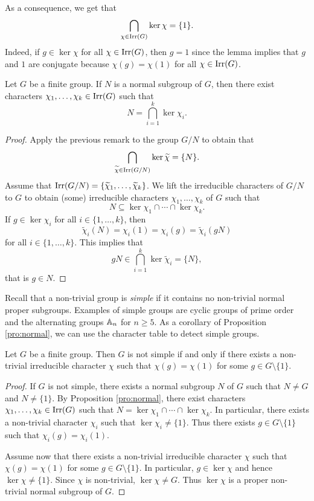 As a consequence, we get that 
\begin{equation}
\label{eq:kernels}
\bigcap_{\chi\in\operatorname{Irr}(G)}\ker\chi=\{1\}.
\end{equation}
Indeed, if $g\in\ker\chi$ for all $\chi\in\operatorname{Irr}(G)$, then $g=1$ since 
the lemma implies that $g$ and $1$ are conjugate
because 
$\chi(g)=\chi(1)$ for all $\chi\in\operatorname{Irr}(G)$.

\begin{proposition}
\label{pro:normal}
    Let $G$ be a finite group. 
    If $N$ is a normal subgroup of $G$, 
    then there exist characters
    $\chi_1,\dots,\chi_k\in\operatorname{Irr}(G)$ 
    such that
    \[
    N=\bigcap_{i=1}^k\ker\chi_i.
    \]
\end{proposition}

\begin{proof}
    Apply the previous remark to the group $G/N$ to obtain that 
    \[
    \bigcap_{\widetilde{\chi}\in\operatorname{Irr}(G/N)}\ker\widetilde{\chi}=\{N\}.
    \]
    Assume that $\operatorname{Irr}(G/N)=\{\widetilde{\chi}_1,\dots,\widetilde{\chi}_k\}$. 
    We lift the irreducible characters of $G/N$ to $G$ 
    to obtain (some) irreducible characters $\chi_1,\dots,\chi_k$ 
    of $G$ such that 
    \[
    N\subseteq\ker\chi_1\cap\cdots\cap\ker\chi_k.
    \]
    If $g\in\ker\chi_i$ for all $i\in\{1,\dots,k\}$, then 
    \[
    \widetilde{\chi}_i(N)=\chi_i(1)=\chi_i(g)=\widetilde{\chi}_i(gN)
    \]
    for all $i\in\{1,\dots,k\}$. This implies that
    \[
    gN\in\bigcap_{i=1}^k\ker\widetilde{\chi}_i=\{N\},
    \]
    that is $g\in N$. 
\end{proof}

Recall that a non-trivial group is \emph{simple} if it contains no non-trivial normal 
proper subgroups. Examples of simple groups are cyclic groups of prime order
and the alternating groups $\mathbb{A}_n$ for $n\geq5$. 
As a corollary of Proposition \ref{pro:normal}, 
we can use the character table to detect simple groups.

\begin{proposition}
    Let $G$ be a finite group. Then $G$ is not simple if and only if 
    there exists a non-trivial irreducible character $\chi$ such that
    $\chi(g)=\chi(1)$ 
    for some $g\in G\setminus\{1\}$. 
\end{proposition}

\begin{proof}
    If $G$ is not simple, there exists a normal subgroup $N$ of $G$ such that
    $N\ne G$ and $N\ne\{1\}$. 
    By Proposition \ref{pro:normal}, there exist characters 
    $\chi_1,\dots,\chi_k\in\operatorname{Irr}(G)$
    such that 
    $N=\ker\chi_1\cap\cdots\cap\ker\chi_k$.
    In particular, there exists a non-trivial character
    $\chi_i$ such that $\ker\chi_i\ne\{1\}$. Thus 
    there exists $g\in G\setminus\{1\}$ such that
    $\chi_i(g)=\chi_i(1)$. 
    
    Assume now that there exists a non-trivial irreducible character $\chi$ 
    such that $\chi(g)=\chi(1)$ for some $g\in G\setminus\{1\}$. In particular, $g\in\ker\chi$ 
    and hence $\ker\chi\ne\{1\}$. Since $\chi$ is non-trivial, $\ker\chi\ne G$. 
    Thus $\ker\chi$ is a proper non-trivial normal subgroup of $G$.
\end{proof}

